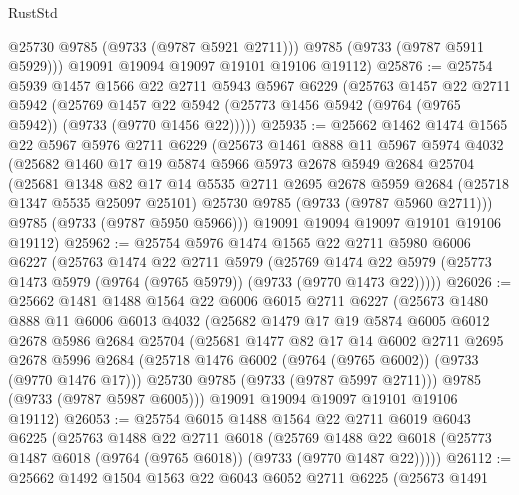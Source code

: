 \begin{lexlean}{RustStd}
\begin{coremodule}
{\begin{coremodule}
{{{{{{{{{{{{{{{{{{{{{{{{{{{{{{{{{{{{{{{{{{{{{{{{{{{{{{{          @25730
          @9785
          (@9733 (@9787 @5921 @2711)))
        @9785
        (@9733 (@9787 @5911 @5929)))
      @19091
      @19094
      @19097
      @19101
      @19106
      @19112)
@25876 := @25754
    @5939
    @1457
    @1566
    @22
    @2711
    @5943
    @5967
    @6229
    (@25763
      @1457
      @22
      @2711
      @5942
      (@25769 @1457 @22 @5942 (@25773 @1456 @5942 (@9764 (@9765 @5942)) (@9733 (@9770 @1456 @22)))))
@25935 := @25662
    @1462
    @1474
    @1565
    @22
    @5967
    @5976
    @2711
    @6229
    (@25673
      @1461
      @888
      @11
      @5967
      @5974
      @4032
      (@25682
        @1460
        @17
        @19
        @5874
        @5966
        @5973
        @2678
        @5949
        @2684
        @25704
        (@25681
          @1348
          @82
          @17
          @14
          @5535
          @2711
          @2695
          @2678
          @5959
          @2684
          (@25718 @1347 @5535 @25097 @25101)
          @25730
          @9785
          (@9733 (@9787 @5960 @2711)))
        @9785
        (@9733 (@9787 @5950 @5966)))
      @19091
      @19094
      @19097
      @19101
      @19106
      @19112)
@25962 := @25754
    @5976
    @1474
    @1565
    @22
    @2711
    @5980
    @6006
    @6227
    (@25763
      @1474
      @22
      @2711
      @5979
      (@25769 @1474 @22 @5979 (@25773 @1473 @5979 (@9764 (@9765 @5979)) (@9733 (@9770 @1473 @22)))))
@26026 := @25662
    @1481
    @1488
    @1564
    @22
    @6006
    @6015
    @2711
    @6227
    (@25673
      @1480
      @888
      @11
      @6006
      @6013
      @4032
      (@25682
        @1479
        @17
        @19
        @5874
        @6005
        @6012
        @2678
        @5986
        @2684
        @25704
        (@25681
          @1477
          @82
          @17
          @14
          @6002
          @2711
          @2695
          @2678
          @5996
          @2684
          (@25718 @1476 @6002 (@9764 (@9765 @6002)) (@9733 (@9770 @1476 @17)))
          @25730
          @9785
          (@9733 (@9787 @5997 @2711)))
        @9785
        (@9733 (@9787 @5987 @6005)))
      @19091
      @19094
      @19097
      @19101
      @19106
      @19112)
@26053 := @25754
    @6015
    @1488
    @1564
    @22
    @2711
    @6019
    @6043
    @6225
    (@25763
      @1488
      @22
      @2711
      @6018
      (@25769 @1488 @22 @6018 (@25773 @1487 @6018 (@9764 (@9765 @6018)) (@9733 (@9770 @1487 @22)))))
@26112 := @25662
    @1492
    @1504
    @1563
    @22
    @6043
    @6052
    @2711
    @6225
    (@25673
      @1491
}}}}}}}}}}}}}}}}}}}}}}}}}}}}}}}}}}}}}}}}}}}}}}}}}}}}}}}
\end{coremodule}}
\end{coremodule}
\end{lexlean}
